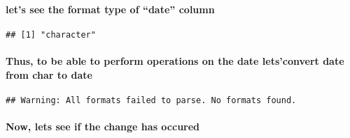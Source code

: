 \documentclass[
]{article}
\newenvironment{Shaded}{\begin{snugshade}}{\end{snugshade}}
\newcommand{\FunctionTok}[1]{\textcolor[rgb]{0.00,0.00,0.00}{#1}}
\newcommand{\NormalTok}[1]{#1}
\newcommand{\OtherTok}[1]{\textcolor[rgb]{0.56,0.35,0.01}{#1}}
\newcommand{\SpecialCharTok}[1]{\textcolor[rgb]{0.00,0.00,0.00}{#1}}
\begin{document}
\hypertarget{lets-see-the-format-type-of-date-column}{%
\paragraph{let's see the format type of ``date''
column}\label{lets-see-the-format-type-of-date-column}}

\begin{Shaded}
\end{Shaded}

\begin{verbatim}
## [1] "character"
\end{verbatim}

\hypertarget{thus-to-be-able-to-perform-operations-on-the-date-letsconvert-date-from-char-to-date}{%
\paragraph{\texorpdfstring{Thus, to be able to perform operations on the
date lets'convert \textbf{date from char to
date}}{Thus, to be able to perform operations on the date lets'convert date from char to date}}\label{thus-to-be-able-to-perform-operations-on-the-date-letsconvert-date-from-char-to-date}}

\begin{Shaded}
\end{Shaded}

\begin{verbatim}
## Warning: All formats failed to parse. No formats found.
\end{verbatim}

\hypertarget{now-lets-see-if-the-change-has-occured}{%
\paragraph{Now, lets see if the change has
occured}\label{now-lets-see-if-the-change-has-occured}}

\begin{Shaded}
\end{Shaded}
\end{document}
